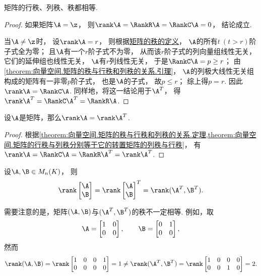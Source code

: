 \begin{theorem}\label{theorem:向量空间.矩阵的秩与行秩和列秩的关系.定理}
矩阵的行秩、列秩、秩都相等.
\begin{proof}
如果矩阵\(\A = \z\)，
则\(\rank\A=\RankR\A=\RankC\A=0\)，
结论成立.

当\(\A\neq\z\)时，
设\(\rank\A=r\)，
则根据\hyperref[definition:线性方程组.矩阵的秩的定义]{矩阵的秩的定义}，
\(\A\)的所有\(t\ (t > r)\)阶子式全为零；
且\(\A\)有一个\(r\)阶子式不为零，
从而该\(r\)阶子式的列向量组线性无关，
它们的延伸组也线性无关，
\(\A\)有\(r\)列线性无关，
于是\(\RankC\A=p \geq r\)；
由\cref{theorem:向量空间.矩阵的秩与行秩和列秩的关系.引理}，
\(\A\)的列极大线性无关组构成的矩阵有一非零\(p\)阶子式，
也是\(\A\)的子式，
故\(p \leq r\)；
综上得\(p = r\).
因此\(\rank\A=\RankC\A\).
同样地，将这一结论用于\(\A^T\)，
得\(\rank\A^T=\RankC\A^T=\RankR\A\).
\end{proof}
\end{theorem}

\begin{theorem}\label{theorem:向量空间.转置不变秩}
设\(\A\)是矩阵，那么\(\rank\A = \rank\A^T\).
\begin{proof}
根据\cref{theorem:向量空间.矩阵的秩与行秩和列秩的关系.定理,theorem:向量空间.矩阵的行秩与列秩分别等于它的转置矩阵的列秩与行秩}，
有\(\rank\A=\RankC\A=\RankR\A^T=\rank\A^T\).
\end{proof}
\end{theorem}

\begin{example}
设\(\A,\B \in M_n(K)\)，
则\[
	\rank\begin{bmatrix}
		\A \\ \B
	\end{bmatrix}
	= \rank\begin{bmatrix}
		\A \\ \B
	\end{bmatrix}^T
	= \rank(\A^T,\B^T).
\]
\end{example}
\begin{remark}
需要注意的是，矩阵\((\A,\B)\)与\((\A^T,\B^T)\)的秩不一定相等.
例如，取\[
	\A = \begin{bmatrix}
		1 & 0 \\
		0 & 0
	\end{bmatrix},
	\qquad
	\B = \begin{bmatrix}
		0 & 1 \\
		0 & 0
	\end{bmatrix},
\]
然而\[
	\rank(\A,\B)
	= \rank\begin{bmatrix}
		1 & 0 & 0 & 1 \\
		0 & 0 & 0 & 0
	\end{bmatrix}
	= 1
	\neq
	\rank(\A^T,\B^T)
	= \rank\begin{bmatrix}
		1 & 0 & 0 & 0 \\
		0 & 0 & 1 & 0
	\end{bmatrix}
	= 2.
\]
\end{remark}

